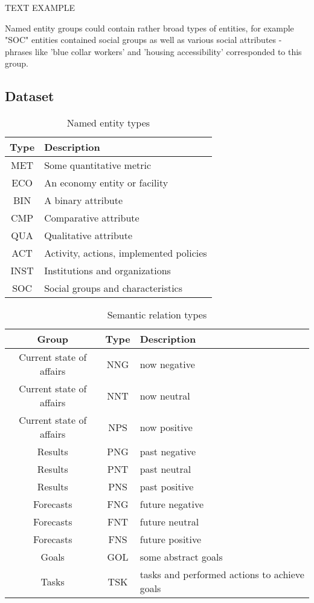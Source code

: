 \documentclass{dialogue}
\begin{document}
TEXT EXAMPLE
 
Named entity groups could contain rather broad types of entities, for example "SOC" entities contained social groups as well as various social attributes - phrases like 'blue collar workers' and 'housing accessibility' corresponded to this group.
\subsection{Dataset}
\begin{table}[bth]
	\centering
	\small
	\begin{tabular}{c||p{8cm}}
		\hline
		Type & Description\\ \hline
		MET & Some quantitative metric \\ \hline
		ECO & An economy entity or facility\\ \hline
		BIN & A binary attribute\\ \hline
		CMP & Comparative attribute\\ \hline
		QUA & Qualitative attribute\\ \hline
		ACT & Activity, actions, implemented policies\\ \hline
		INST & Institutions and organizations\\ \hline
		SOC & Social groups and characteristics\\ \hline
	\end{tabular}
	\caption{Named entity types}
	\label{tab:ner}
\end{table}
\begin{table}[bth]
	\centering
	\small
	\begin{tabular}{c|c|p{8cm}}
		\hline
		Group & Type & Description\\ \hline
		Current state of affairs & NNG & now negative \\ \hline
		Current state of affairs & NNT & now neutral \\ \hline
		Current state of affairs & NPS & now positive \\ \hline\hline

		Results & PNG & past negative\\ \hline
		Results & PNT & past neutral\\ \hline
		Results & PNS & past positive\\ \hline\hline

		Forecasts & FNG & future negative\\ \hline
		Forecasts & FNT & future neutral\\ \hline
		Forecasts & FNS & future positive\\ \hline\hline

		Goals & GOL & some abstract goals\\ \hline
		Tasks & TSK & tasks and performed actions to achieve goals\\ \hline

	\end{tabular}
	\caption{Semantic relation types}
	\label{tab:rel}
\end{table}
\end{document}
